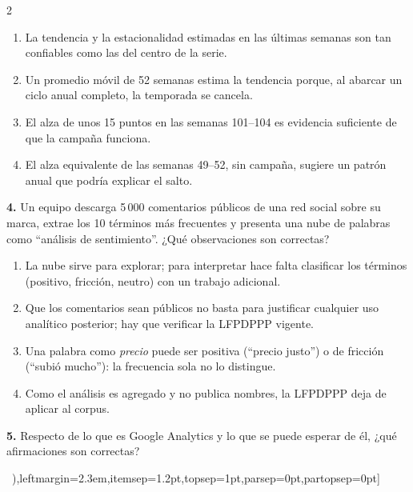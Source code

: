 \documentclass[10pt,letterpaper]{article}
\newcommand{\cas}{\framebox[1.0em]{\rule{0pt}{1.05ex}}}
\begin{document}
\begin{multicols}{2}
\begin{minipage}[t]{\columnwidth}
\begin{enumerate}[label=\cas\ \alph*),leftmargin=2.3em,itemsep=1.2pt,topsep=1pt,parsep=0pt,partopsep=0pt]
\item La tendencia y la estacionalidad estimadas en las últimas semanas son tan confiables como las del centro de la serie.
\item Un promedio móvil de 52 semanas estima la tendencia porque, al abarcar un ciclo anual completo, la temporada se cancela.
\item El alza de unos 15 puntos en las semanas 101--104 es evidencia suficiente de que la campaña funciona.
\item El alza equivalente de las semanas 49--52, sin campaña, sugiere un patrón anual que podría explicar el salto.
\end{enumerate}\end{minipage}\par\vspace{3pt}
\begin{minipage}[t]{\columnwidth}\noindent\textbf{4.} Un equipo descarga 5\,000 comentarios públicos de una red social sobre su marca, extrae los 10 términos más frecuentes y presenta una nube de palabras como \enquote{análisis de sentimiento}. ¿Qué observaciones son correctas?
\vspace{1pt}\begin{enumerate}[label=\cas\ \alph*),leftmargin=2.3em,itemsep=1.2pt,topsep=1pt,parsep=0pt,partopsep=0pt]
\item La nube sirve para explorar; para interpretar hace falta clasificar los términos (positivo, fricción, neutro) con un trabajo adicional.
\item Que los comentarios sean públicos no basta para justificar cualquier uso analítico posterior; hay que verificar la LFPDPPP vigente.
\item Una palabra como \textit{precio} puede ser positiva (\enquote{precio justo}) o de fricción (\enquote{subió mucho}): la frecuencia sola no lo distingue.
\item Como el análisis es agregado y no publica nombres, la LFPDPPP deja de aplicar al corpus.
\end{enumerate}\end{minipage}\par\vspace{3pt}
\begin{minipage}[t]{\columnwidth}\noindent\textbf{5.} Respecto de lo que es Google Analytics y lo que se puede esperar de él, ¿qué afirmaciones son correctas?
\vspace{1pt}\begin{enumerate}[label=\cas\ \alph*),leftmargin=2.3em,itemsep=1.2pt,topsep=1pt,parsep=0pt,partopsep=0pt]

\end{enumerate}
\end{minipage}
\end{multicols}
\end{document}
